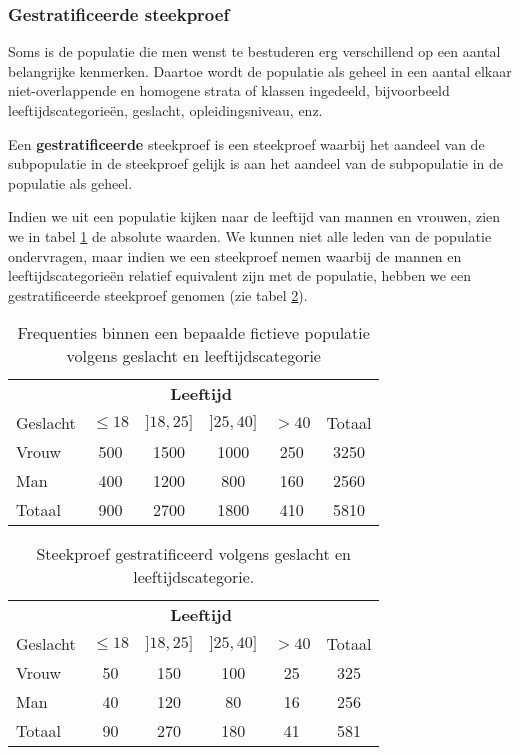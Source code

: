\subsubsection{Gestratificeerde steekproef}

Soms is de populatie die men wenst te bestuderen erg verschillend op een aantal belangrijke kenmerken. Daartoe wordt de populatie als geheel in een aantal elkaar niet-overlappende en homogene strata of klassen ingedeeld, bijvoorbeeld leeftijdscategorieën, geslacht, opleidingsniveau, enz.

\begin{definition}
  Een \textbf{gestratificeerde}  steekproef is een steekproef waarbij het aandeel van de subpopulatie in de steekproef gelijk is aan het aandeel van de subpopulatie in de populatie als geheel.
\end{definition}

\begin{example}
  Indien we uit een populatie kijken naar de leeftijd van  mannen en vrouwen, zien we in tabel \ref{tab:frequenties-populatie} de absolute waarden. We kunnen niet alle leden van de populatie ondervragen, maar indien we een steekproef nemen waarbij de mannen en leeftijdscategorieën relatief equivalent zijn met de populatie, hebben we een gestratificeerde steekproef genomen (zie tabel \ref{tab:frequenties-steekproef}).
\end{example}

\begin{table}
  \centering
  \begin{tabular}{l|cccc|c}
    & \multicolumn{4}{c|}{\textbf{Leeftijd}} & \\
    Geslacht & $\le 18$ & $]18,25]$ & $]25, 40]$ & $> 40$ & Totaal\\
    \hline
    Vrouw & 500 & 1500 & 1000 & 250 & 3250 \\
    Man   & 400 & 1200 & 800 & 160 & 2560\\
    \hline
    Totaal & 900 & 2700 & 1800 & 410 & 5810
  \end{tabular}
  \caption{Frequenties binnen een bepaalde fictieve populatie volgens geslacht en leeftijdscategorie}
  \label{tab:frequenties-populatie}
\end{table}

\begin{table}
  \centering
  \begin{tabular}{l|cccc|c}
    & \multicolumn{4}{c|}{\textbf{Leeftijd}} & \\
    Geslacht & $\le 18$ & $]18,25]$ & $]25, 40]$ & $> 40$ & Totaal\\
    \hline
    Vrouw & 50 & 150 & 100 & 25 & 325 \\
    Man   & 40 & 120 & 80 & 16 & 256\\
    \hline
    Totaal & 90 & 270 & 180 & 41 & 581
  \end{tabular}
  \caption{Steekproef gestratificeerd volgens geslacht en leeftijdscategorie.}
  \label{tab:frequenties-steekproef}
\end{table}

